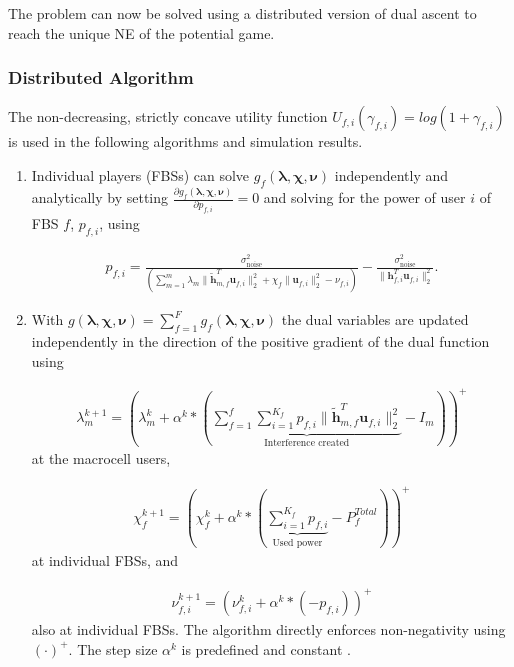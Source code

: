 The problem can now be solved using a distributed version of dual ascent to reach the unique NE of the potential game. 
\subsubsection{Distributed Algorithm}\label{algo1}
The non-decreasing, strictly concave utility function $U_{f,i}(\gamma_{f,i}) = log(1+\gamma_{f,i})$ 
is used in the following algorithms and simulation results.

\begin{enumerate}
\item 
Individual players (FBSs) can solve $ g_f(\boldsymbol{\lambda},\boldsymbol{\chi},\boldsymbol{\nu})$ independently and analytically by setting $\frac{\partial g_f(\boldsymbol{\lambda},\boldsymbol{\chi},\boldsymbol{\nu})}{\partial p_{f,i}} = 0$ 
and solving for the power of user $i$ of FBS $f$, $p_{f,i}$, using

\begin{gather}
p_{f,i} = \frac{\sigma^2_{\text{noise}}}{(\sum_{m=1}^{m}\lambda_{m}\|\tilde{\mathbf{h}}_{m,f}^T \mathbf{u}_{f,i}\|^2_2
+\chi_{f} \|\mathbf{u}_{f,i}\|^2_2
-\nu_{f,i}
 )}-
  \frac{\sigma^2_{\text{noise}}}{\|\mathbf{h}_{f,i}^T \mathbf{u}_{f,i}\|^2_2}.
\end{gather}

\item 
With $g(\boldsymbol{\lambda},\boldsymbol{\chi},\boldsymbol{\nu}) = \sum_{f=1}^{F}g_f(\boldsymbol{\lambda},\boldsymbol{\chi},\boldsymbol{\nu})$ the dual variables are updated independently in the direction of the positive gradient of the dual function using

\begin{gather}
\lambda_{m}^{k+1} = (
\lambda_{m}^{k}
+
\alpha^{k}*
(
\underbrace{
\sum _{f=1}^{f}
\sum _{i=1}^{K_{f}}
p_{f,i}
\|\tilde{\mathbf{h}}_{m,f}^T \mathbf{u}_{f,i}\|^2_2}_{\text{Interference created}}
- I_{m}
))^+
\end{gather}
 at the macrocell users,

\begin{gather}
\chi_{f}^{k+1} = (
\chi_{f}^{k}
+
\alpha^{k}*
(\underbrace{\sum_{i=1}^{K_{f}} p_{f,i}}_{\text{Used power}} - P_{f}^{Total}) )^+
\end{gather}
 at individual FBSs, and 

\begin{gather}
\nu_{f,i}^{k+1} = (
\nu_{f,i}^{k}
+
\alpha^{k}*
(-p_{f,i}))^+
\end{gather}
also at individual FBSs.
The algorithm directly enforces non-negativity using $(\cdot)^+$.
The step size $\alpha^{k}$ is predefined and constant .



\end{enumerate} 
